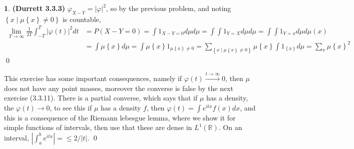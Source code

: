\documentclass{article}
\theoremstyle{definition}
\newtheorem{pb}{}
\newcommand{\set}[1]{\left\{#1\right\}}
\newcommand{\abs}[1]{\left\vert#1\right\vert}
\begin{document}
    \begin{pb}\textbf{(Durrett 3.3.3)}
        \(\varphi_{X-Y} = \abs{\varphi}^2\), so by the previous problem, and noting \(\set{x \mid \mu\set{x} \neq 0}\) is countable,
        \begin{align*}
            \lim_{T\to\infty}\frac{1}{2T}\int_{-T}^T \abs{\varphi(t)}^2dt &= P(X-Y = 0) = \int{1_{X - Y = 0}}d\mu d\mu = \int \int 1_{Y=X} d\mu d\mu = \int \int 1_{Y = x}d \mu d\mu(x) \\
            &= \int \mu\set{x} d\mu = \int\mu\set{x}1_{\mu\set{x}\neq 0} = \sum_{\set{x \mid \mu\set{x} \neq 0}} \mu\set{x}\int 1_{\set{x}}d\mu = \sum_x \mu\set{x}^2
        \end{align*} \qed

        This exercise has some important consequences, namely if \(\varphi(t) \overset{t\to\infty}{\longrightarrow} 0\), then \(\mu\) does not have any point masses, moreover the converse is false by the next exercise (3.3.11). There is a partial converse, which says that if \(\mu\) has a density, the \(\varphi(t) \to 0\), to see this if \(\mu\) has a density \(f\), then \(\varphi(t) = \int e^{itx}f(x)dx\), and this is a consequence of the Riemann lebesgue lemma, where we show it for simple functions of intervals, then use that these are dense in \(L^1(\mathbb{R})\). On an interval, \(\abs{\int_a^b e^{itx}} = \leq 2/\abs{t}\). \qed
    \end{pb}
\end{document}

